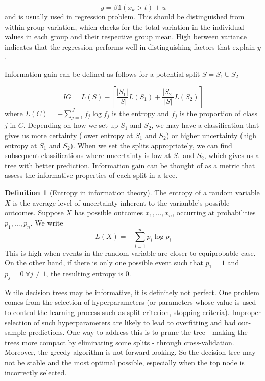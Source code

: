 \documentclass[12pt]{article}
\theoremstyle{definition}
\newtheorem{definition}{Definition}[section]
\theoremstyle{property}
\theoremstyle{assumption}
\theoremstyle{example}
\theoremstyle{comment}
\begin{document}
\[
y=\beta\mathbb{1}(x_k>t)+u
\]
and is usually used in regression problem. This should be distinguished from within-group variation, which checks for the total variation in the individual values in each group and their respective group mean. High between variance indicates that the regression performs well in distinguishing factors that explain $y$. \par 
Information gain can be defined as follows for a potential split $S=S_1\cup S_2$ \par
\[
IG = L(S)-\left[\frac{|S_1|}{|S|}L(S_1)+\frac{|S_2|}{|S|}L(S_2)\right]
\]
where $L(C)=-\sum_{j=1}^J f_j \log{f_j}$ is the entropy and $f_j$ is the proportion of class $j$ in $C$. Depending on how we set up $S_1$ and $S_2$, we may have a classification that gives us more certainty (lower entropy at $S_1$ and $S_2$) or higher uncertainty (high entropy at $S_1$ and $S_2$). When we set the splits appropriately, we can find subsequent classifications where uncertainty is low at $S_1$ and $S_2$, which gives us a tree with better prediction. Information gain can be thought of as a metric that assess the informative properties of each split in a tree. \par
\begin{mdframed}[backgroundcolor=blue!5] 
\begin{definition}[Entropy in information theory] The entropy of a random variable $X$ is the average level of uncertainty inherent to the varianble's possible outcomes. Suppose $X$ has possible outcomes $x_1,...,x_n$, occurring at probabilities $p_1,...,p_n$. We write
\[
L(X)=-\sum_{i=1}^n p_i\log{p_i}
\]
This is high when events in the random variable are closer to equiprobable case. On the other hand, if there is only one possible event such that $p_1=1$ and $p_j=0\ \forall j\neq1$, the resulting entropy is 0. 
\end{definition}
\end{mdframed}\par
While decision trees may be informative, it is definitely not perfect. One problem comes from the selection of hyperparameters (or parameters whose value is used to control the learning process such as split criterion, stopping criteria). Improper selection of such hyperparameters are likely to lead to overfitting and bad out-sample predictions. One way to address this is to prune the tree - making the trees more compact by eliminating some splits - through cross-validation. Moreover, the greedy algorithm is not forward-looking. So the decision tree may not be stable and the most optimal possible, especially when the top node is incorrectly selected. 
\end{document}
